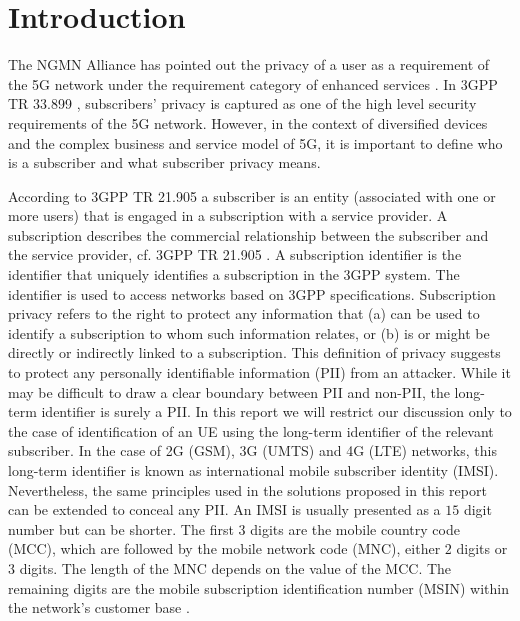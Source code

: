 \documentclass[lnicst,sechang,a4paper]{svmultln}
\begin{document}
\section{Introduction}
\label{intro} The NGMN Alliance has pointed out the privacy of a user as a requirement of the 5G network under the requirement category of enhanced services \cite{NGMN_white_paper}. In 3GPP TR 33.899 \cite{TR33899}, subscribers' privacy is captured as one of the high level security requirements of the 5G network. However, in the context of diversified devices and the complex business and service model of 5G, it is important to define who is a subscriber and what subscriber privacy means. 

According to 3GPP TR 21.905 \cite{TR21905} a subscriber is an entity (associated with one or more users) that is engaged in a subscription with a service provider. A subscription describes the commercial relationship between the subscriber and the service provider, cf. 3GPP TR 21.905 \cite{TR21905}. A subscription identifier is the identifier that uniquely identifies a subscription in the 3GPP system. The identifier is used to access networks based on 3GPP specifications. Subscription privacy refers to the right to protect any information that (a) can be used to identify a subscription to whom such information relates, or (b) is or might be directly or indirectly linked to a subscription. This definition of privacy suggests to protect any personally identifiable information (PII) from an attacker. While it may be difficult to draw a clear boundary between PII and non-PII, the long-term identifier is surely a PII. In this report we will restrict our discussion only to the case of identification of an UE using the long-term identifier of the relevant subscriber. In the case of 2G (GSM), 3G (UMTS) and 4G (LTE) networks, this long-term identifier is known as international mobile subscriber identity (IMSI). Nevertheless, the same principles used in the solutions proposed in this report can be extended to conceal any PII. An IMSI is usually presented as a $15$ digit number but can be shorter. The first $3$ digits are the mobile country code (MCC), which are followed by the mobile network code (MNC), either $2$ digits or $3$ digits. The length of the MNC depends on the value of the MCC. The remaining digits are the mobile subscription identification number (MSIN) within the network's customer base \cite{TS23003}.
\end{document}
